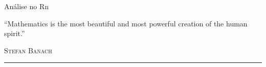 \begin{titlepage}
\vspace*{2cm}

\noindent
\vspace*{0.5cm}
  \titlefont \hspace{-2cm}Análise no Rn \vspace{-0.32cm}\par
\vspace{1cm}
\epigraph{``Mathematics is the most beautiful and most powerful creation of the human spirit.''}
{ \textsc{Stefan Banach}}
\null\vfill
\vspace*{1cm}
\noindent
\hfill
\begin{minipage}{0.45\linewidth}
    \begin{flushright}
        \printauthor
    \end{flushright}
\end{minipage}
%
\begin{minipage}{0.02\linewidth}
    \rule{1pt}{120pt}
\end{minipage}
\titlepagedecoration
\end{titlepage}
